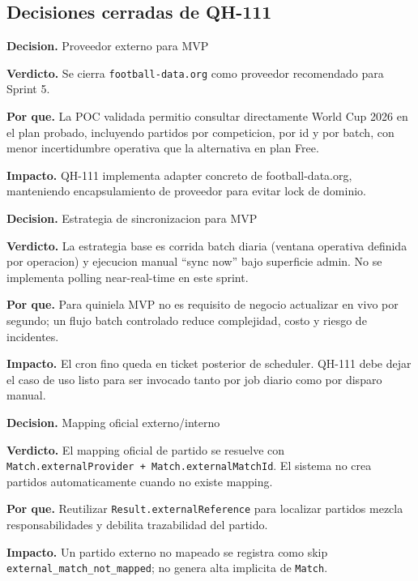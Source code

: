 \subsection{Decisiones cerradas de QH-111}

\begin{docnote}
\textbf{Decision.} Proveedor externo para MVP

\textbf{Verdicto.} Se cierra \texttt{football-data.org} como proveedor recomendado para Sprint 5.

\textbf{Por que.} La POC validada permitio consultar directamente World Cup 2026 en el plan probado, incluyendo partidos por competicion, por id y por batch, con menor incertidumbre operativa que la alternativa en plan Free.

\textbf{Impacto.} QH-111 implementa adapter concreto de football-data.org, manteniendo encapsulamiento de proveedor para evitar lock de dominio.
\end{docnote}

\begin{docnote}
\textbf{Decision.} Estrategia de sincronizacion para MVP

\textbf{Verdicto.} La estrategia base es corrida batch diaria (ventana operativa definida por operacion) y ejecucion manual ``sync now'' bajo superficie admin. No se implementa polling near-real-time en este sprint.

\textbf{Por que.} Para quiniela MVP no es requisito de negocio actualizar en vivo por segundo; un flujo batch controlado reduce complejidad, costo y riesgo de incidentes.

\textbf{Impacto.} El cron fino queda en ticket posterior de scheduler. QH-111 debe dejar el caso de uso listo para ser invocado tanto por job diario como por disparo manual.
\end{docnote}

\begin{docnote}
\textbf{Decision.} Mapping oficial externo/interno

\textbf{Verdicto.} El mapping oficial de partido se resuelve con \texttt{Match.externalProvider + Match.externalMatchId}. El sistema no crea partidos automaticamente cuando no existe mapping.

\textbf{Por que.} Reutilizar \texttt{Result.externalReference} para localizar partidos mezcla responsabilidades y debilita trazabilidad del partido.

\textbf{Impacto.} Un partido externo no mapeado se registra como skip \texttt{external\_match\_not\_mapped}; no genera alta implicita de \texttt{Match}.
\end{docnote}

